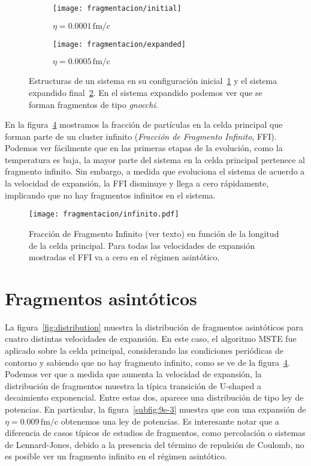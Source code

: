 \begin{figure} \centering
  \begin{subfigure}[h!]{0.45\columnwidth}
    \texttt{[image: fragmentacion/initial]}
    \caption{$\eta = 0.0001\,\text{fm/c}$}
    \label{subfig:initial}
  \end{subfigure}
  \begin{subfigure}[h!]{0.45\columnwidth}
    \texttt{[image: fragmentacion/expanded]}
    \caption{$\eta = 0.0005\,\text{fm/c}$}
    \label{subfig:expanded}
  \end{subfigure}
  \caption{Estructuras de un sistema en su configuración inicial~\ref{subfig:initial} y el sistema expandido final~\ref{subfig:expanded}.
    En el sistema expandido podemos ver que se forman fragmentos de tipo \emph{gnocchi}.}
  \label{fig:morpho_frag}
\end{figure}

En la figura~\ref{fig:infinito} mostramos la fracción de partículas en la celda principal que forman parte de un cluster infinito (\emph{Fracción de Fragmento Infinito}, FFI).
Podemos ver fácilmente que en las primeras etapas de la evolución, como la temperatura es baja, la mayor parte del sistema en la celda principal pertenece al fragmento infinito.
Sin embargo, a medida que evoluciona el sistema de acuerdo a la velocidad de expansión, la FFI disminuye y llega a cero rápidamente, implicando que no hay fragmentos infinitos en el sistema.

\begin{figure}
  \centering
  \texttt{[image: fragmentacion/infinito.pdf]}
  \caption{Fracción de Fragmento Infinito (ver texto) en función de la longitud de la celda principal.
    Para todas las velocidades de expansión mostradas el FFI va a cero en el régimen asintótico.}
  \label{fig:infinito}
\end{figure}

\section{Fragmentos asintóticos}

La figura~\ref{fig:distribution} muestra la distribución de fragmentos asintóticos para cuatro distintas velocidades de expansión.
En este caso, el algoritmo MSTE fue aplicado sobre la celda principal, considerando las condiciones periódicas de contorno y sabiendo que no hay fragmento infinito, como se ve de la figura~\ref{fig:infinito}.
Podemos ver que a medida que aumenta la velocidad de expansión, la distribución de fragmentos muestra la típica transición de U-shaped a decaimiento exponencial.
Entre estas dos, aparece una distribución de tipo ley de potencias.
En particular, la figura~\ref{subfig:9e-3} muestra que con una expansión de $\eta = 0.009\,\text{fm/c}$ obtenemos una ley de potencias.
Es interesante notar que a diferencia de casos típicos de estudios de fragmentos, como percolación o sistemas de Lennard-Jones, debido a la presencia del término de repulsión de Coulomb, no es posible ver un fragmento infinito en el régimen asintótico.

